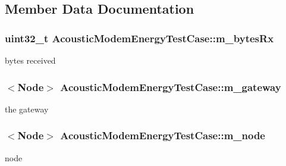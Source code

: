 \subsection{Member Data Documentation}
\subsubsection[{\texorpdfstring{m\+\_\+bytes\+Rx}{m_bytesRx}}]{\setlength{\rightskip}{0pt plus 5cm}uint32\+\_\+t Acoustic\+Modem\+Energy\+Test\+Case\+::m\+\_\+bytes\+Rx}\hypertarget{classAcousticModemEnergyTestCase_ac495120a94cd751178784b417141e593}{}\label{classAcousticModemEnergyTestCase_ac495120a94cd751178784b417141e593}


bytes received 

\subsubsection[{\texorpdfstring{m\+\_\+gateway}{m_gateway}}]{$<${\bf Node}$>$ Acoustic\+Modem\+Energy\+Test\+Case\+::m\+\_\+gateway}\hypertarget{classAcousticModemEnergyTestCase_a132723c335a308fc1d4be16bc79f49cf}{}\label{classAcousticModemEnergyTestCase_a132723c335a308fc1d4be16bc79f49cf}


the gateway 

\subsubsection[{\texorpdfstring{m\+\_\+node}{m_node}}]{$<${\bf Node}$>$ Acoustic\+Modem\+Energy\+Test\+Case\+::m\+\_\+node}\hypertarget{classAcousticModemEnergyTestCase_a70215894f46e0f4c11d7adb48fce7d44}{}\label{classAcousticModemEnergyTestCase_a70215894f46e0f4c11d7adb48fce7d44}


node 

